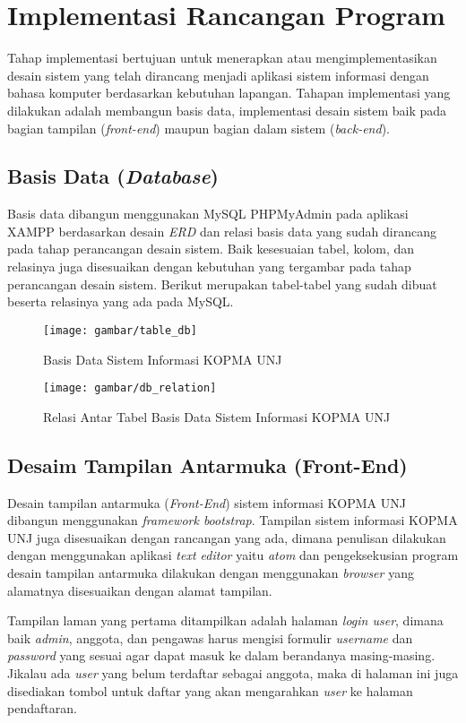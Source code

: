 \section{Implementasi Rancangan Program}
Tahap implementasi bertujuan untuk menerapkan atau mengimplementasikan desain sistem yang telah dirancang menjadi aplikasi sistem informasi dengan bahasa komputer berdasarkan kebutuhan lapangan. Tahapan implementasi yang dilakukan adalah membangun basis data, implementasi desain sistem baik pada bagian tampilan (\textit{front-end}) maupun bagian dalam sistem (\textit{back-end}).

\subsection{Basis Data (\textit{Database})}
Basis data dibangun menggunakan MySQL PHPMyAdmin pada aplikasi XAMPP berdasarkan desain \textit{ERD} dan relasi basis data yang sudah dirancang pada tahap perancangan desain sistem. Baik kesesuaian tabel, kolom, dan relasinya juga disesuaikan dengan kebutuhan yang tergambar pada tahap perancangan desain sistem. Berikut merupakan tabel-tabel yang sudah dibuat beserta relasinya yang ada pada MySQL.

\begin{figure}[H]
	\centering
	\texttt{[image: gambar/table\_db]}
	\caption{Basis Data Sistem Informasi KOPMA UNJ}
\end{figure} 

\begin{figure}[H]
	\centering
	\texttt{[image: gambar/db\_relation]}
	\caption{Relasi Antar Tabel Basis Data Sistem Informasi KOPMA UNJ}
\end{figure} 

\subsection{Desaim Tampilan Antarmuka (Front-End)}
Desain tampilan antarmuka (\textit{Front-End}) sistem informasi KOPMA UNJ dibangun menggunakan \textit{framework bootstrap}. Tampilan sistem informasi KOPMA UNJ juga disesuaikan dengan rancangan yang ada, dimana penulisan dilakukan dengan menggunakan aplikasi \textit{text editor} yaitu \textit{atom} dan pengeksekusian program desain tampilan antarmuka dilakukan dengan menggunakan \textit{browser} yang alamatnya disesuaikan dengan alamat tampilan.

Tampilan laman yang pertama ditampilkan adalah halaman \textit{login user}, dimana baik \textit{admin}, anggota, dan pengawas harus mengisi formulir \textit{username} dan \textit{password} yang sesuai agar dapat masuk ke dalam berandanya masing-masing. Jikalau ada \textit{user} yang belum terdaftar sebagai anggota, maka di halaman ini juga disediakan tombol untuk daftar yang akan mengarahkan \textit{user} ke halaman pendaftaran.

